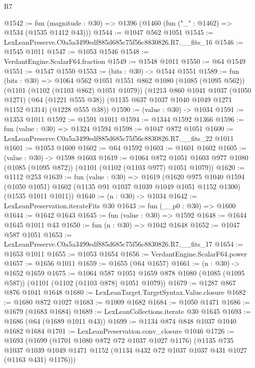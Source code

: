 \begin{lexlean}{R7}
\begin{coremodule}
@1542 := fun (magnitude : @30) => @1396 (@1460 (fun ("_" : @1462) => @1534 (@1535 @1412 @43)))
@1544 := @1047 @562 @1051
@1545 := LexLeanPreserve.C0a5a3499edf885d685c75f56c8830826.R7.__fits_16
@1546 := @1545 @1011
@1547 := @1053 @1546
@1548 := VerdantEngine.ScalarF64.fraction
@1549 := @1548 @1011
@1550 := @64 @1549
@1551 := @1547 @1550
@1553 := (bits : @30) -> @1544 @1551
@1589 := fun (bits : @30) =>
  @1064
    @562
    @1051
    @1551
    @862
    @1080
    (@1085 (@1095 @562))
    (@1101 (@1102 (@1103 @862) @1051 @1079))
    (@1213
      @860
      @1041
      @1037
      (@1050 @1271)
      (@64 (@1221 @555 @38))
      (@1135 @637 @1037 @1040 @1049 @1271 @1152 @1314)
      (@1228 @555 @38))
@1590 := (value : @30) -> @1034
@1591 := @1353 @1011
@1592 := @1591 @1011
@1594 := @1344 @1592 @1366
@1596 := fun (value : @30) => @1324 @1594
@1598 := @1047 @872 @1051
@1600 := LexLeanPreserve.C0a5a3499edf885d685c75f56c8830826.R7.__fits_22 @1011
@1601 := @1053 @1600
@1602 := @64 @1592
@1603 := @1601 @1602
@1605 := (value : @30) -> @1598 @1603
@1619 := @1064
    @872
    @1051
    @1603
    @977
    @1080
    (@1085 (@1095 @872))
    (@1101 (@1102 (@1103 @977) @1051 @1079))
@1620 := @1112 @253
@1639 := fun (value : @30) =>
  @1619
    (@1620
      @975
      @1040
      @1594
      (@1050 @1051)
      @1602
      (@1135 @91 @1037 @1039 @1049 @1051 @1152 @1300)
      (@1535 @1011 @1011))
@1640 := (n : @30) -> @1034
@1642 := LexLeanPreservation.iterateFits @30
@1643 := fun (__p0 : @30) => @1600
@1644 := @1642 @1643
@1645 := fun (value : @30) => @1592
@1648 := @1644 @1645 @1011 @43
@1650 := fun (n : @30) => @1042 @1648
@1652 := @1047 @587 @1051
@1653 := LexLeanPreserve.C0a5a3499edf885d685c75f56c8830826.R7.__fits_17
@1654 := @1653 @1011
@1655 := @1053 @1654
@1656 := VerdantEngine.ScalarF64.power
@1657 := @1656 @1011
@1659 := @1655 (@64 @1657)
@1661 := (n : @30) -> @1652 @1659
@1675 := @1064
    @587
    @1051
    @1659
    @878
    @1080
    (@1085 (@1095 @587))
    (@1101 (@1102 (@1103 @878) @1051 @1079))
@1679 := @1287 @867 @876 @1041 @1648
@1680 := LexLeanTarget.TargetSyntax.Value.closure
@1682 := @1680 @872 @1027
@1683 := @1009 @1682
@1684 := @1050 @1471
@1686 := @1679 (@1683 @1684)
@1689 := LexLeanCollections.iterate @30 @1645
@1693 := @1686 (@64 (@1689 @1011 @43))
@1699 := @1134 @874 @848 @1037 @1040 @1682 @1684
@1701 := LexLeanPreservation.conv_closure @1046
@1726 := @1693
    (@1699
      (@1701 @1080 @872 @72 @1037 @1027 @1176)
      (@1135
        @735
        @1037
        @1039
        @1049
        @1471
        @1152
        (@1134 @432 @72 @1037 @1037 @431 @1027 (@1163 @431) @1176)))

\end{coremodule}
\end{lexlean}
